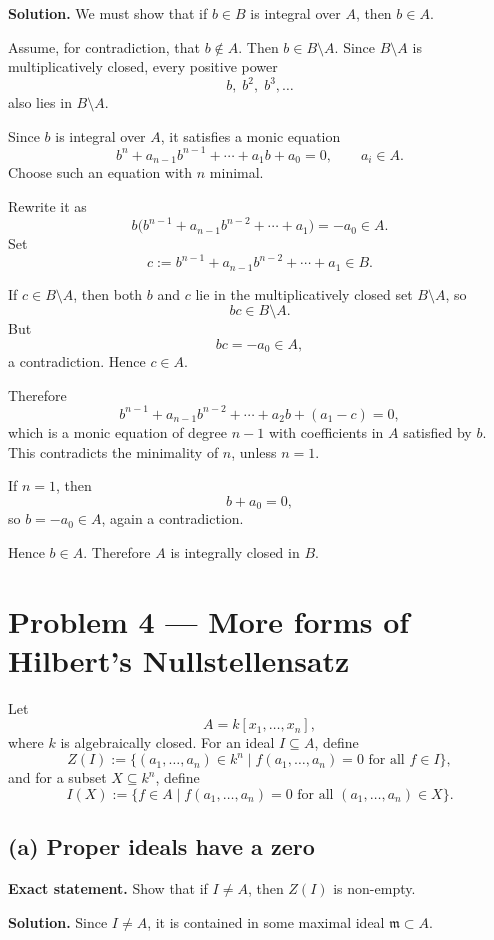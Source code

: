 \documentclass[12pt,a4paper,oneside]{report}
\theoremstyle{notespace}
\begin{document}
\textbf{Solution.}
We must show that if \(b\in B\) is integral over \(A\), then \(b\in A\).

Assume, for contradiction, that \(b\notin A\). Then \(b\in B\setminus A\). Since \(B\setminus A\) is multiplicatively closed, every positive power
\[
b,\;b^2,\;b^3,\dots
\]
also lies in \(B\setminus A\).

Since \(b\) is integral over \(A\), it satisfies a monic equation
\[
b^n+a_{n-1}b^{n-1}+\cdots+a_1b+a_0=0,
\qquad a_i\in A.
\]
Choose such an equation with \(n\) minimal.

Rewrite it as
\[
b\bigl(b^{n-1}+a_{n-1}b^{n-2}+\cdots+a_1\bigr)=-a_0\in A.
\]
Set
\[
c:=b^{n-1}+a_{n-1}b^{n-2}+\cdots+a_1\in B.
\]

If \(c\in B\setminus A\), then both \(b\) and \(c\) lie in the multiplicatively closed set \(B\setminus A\), so
\[
bc\in B\setminus A.
\]
But
\[
bc=-a_0\in A,
\]
a contradiction. Hence \(c\in A\).

Therefore
\[
b^{n-1}+a_{n-1}b^{n-2}+\cdots+a_2b+(a_1-c)=0,
\]
which is a monic equation of degree \(n-1\) with coefficients in \(A\) satisfied by \(b\). This contradicts the minimality of \(n\), unless \(n=1\).

If \(n=1\), then
\[
b+a_0=0,
\]
so \(b=-a_0\in A\), again a contradiction.

Hence \(b\in A\). Therefore \(A\) is integrally closed in \(B\).

\bigskip

\section{Problem 4 --- More forms of Hilbert's Nullstellensatz}

Let
\[
A=k[x_1,\dots,x_n],
\]
where \(k\) is algebraically closed. For an ideal \(I\subseteq A\), define
\[
Z(I):=\{(a_1,\dots,a_n)\in k^n\mid f(a_1,\dots,a_n)=0\text{ for all }f\in I\},
\]
and for a subset \(X\subseteq k^n\), define
\[
I(X):=\{f\in A\mid f(a_1,\dots,a_n)=0\text{ for all }(a_1,\dots,a_n)\in X\}.
\]

\subsection*{(a) Proper ideals have a zero}

\textbf{Exact statement.}
Show that if \(I\neq A\), then \(Z(I)\) is non-empty.

\textbf{Solution.}
Since \(I\neq A\), it is contained in some maximal ideal \(\mathfrak m\subset A\).
\end{document}
